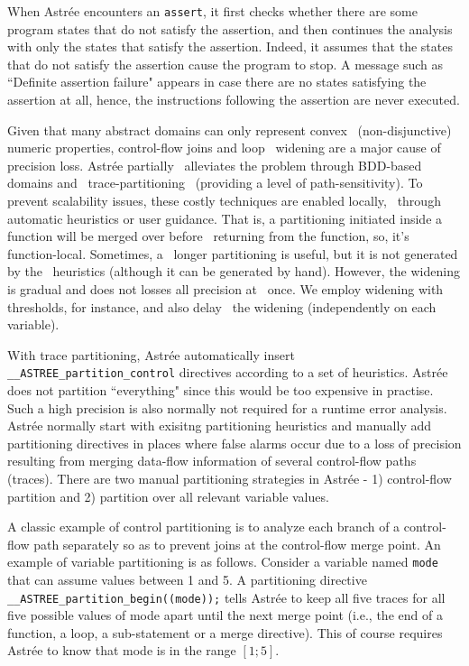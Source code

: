 When Astr{\'e}e encounters an \texttt{assert}, it first checks whether 
there are some program states that do not satisfy the assertion, and 
then continues the analysis with only the states that satisfy the assertion. 
Indeed, it assumes that the states that do not satisfy the assertion cause 
the program to stop.  A message such as ``Definite assertion failure" appears 
in case there are no states satisfying the assertion at all, hence, the 
instructions following the assertion are never executed.


%
%
Given that many abstract domains can only represent convex  
(non-disjunctive) numeric properties, control-flow joins and loop  
widening are a major cause of precision loss.  Astr{\'e}e partially  
alleviates the problem through BDD-based domains and 
trace-partitioning~\cite{DBLP:journals/toplas/RivalM07}
(providing a level of path-sensitivity). 
To prevent scalability 
 issues, 
 these costly techniques are enabled locally, 
 through automatic heuristics 
or user guidance.  That is, a partitioning initiated inside a function will be merged over before  
returning from the function, so, it's function-local. Sometimes, a  
longer partitioning is useful, but it is not generated by the  
heuristics (although it can be generated by hand).
However, the widening is gradual and does not losses all precision at  
once.  We employ widening with thresholds, for instance, and also delay  
the widening (independently on each variable).  


With trace partitioning, Astr{\'e}e automatically insert 
\texttt{\_\_ASTREE\_partition\_control} directives according to a set of 
heuristics.  Astr{\'e}e does not partition ``everything" since this would 
be too expensive in practise. Such a high precision is also normally not 
required for a runtime error analysis. Astr{\'e}e normally start with exisitng 
partitioning heuristics and manually add partitioning directives in places 
where false alarms occur due to a loss of precision resulting from merging 
data-flow information of several control-flow paths (traces).
There are two manual partitioning strategies in Astr{\'e}e - 
1) control-flow partition and 2) partition over all relevant variable values.


A classic example of control partitioning is to analyze each branch of a 
control-flow path separately so as to prevent joins at the control-flow merge 
point.  An example of variable partitioning is as follows. Consider a variable 
named \texttt{mode} that can assume values between 1 and 5.  A partitioning directive 
\texttt{\_\_ASTREE\_partition\_begin((mode));} tells Astr{\'e}e to keep all 
five traces for all five possible values of mode apart 
until the next merge point (i.e., the end of a function, a loop, a sub-statement 
or a merge directive). This of course requires Astr{\'e}e to know that mode is 
in the range $[1;5]$.



